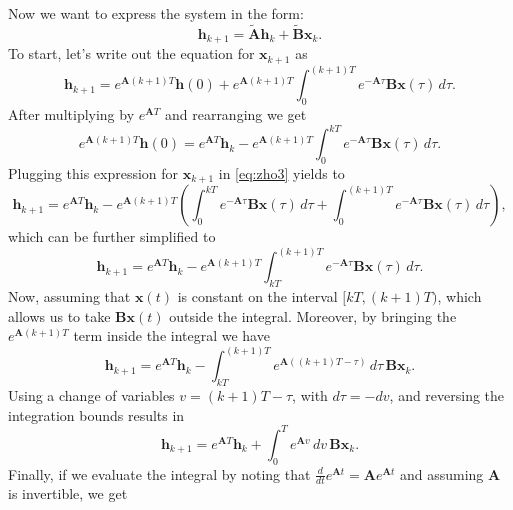 {\begin{equation}
\end{equation}
Now we want to express the system in the form:
\begin{equation}
\mathbf{h}_{k+1} = \mathbf{\tilde{A}} \mathbf{h}_k + \mathbf{\tilde{B}} \mathbf{x}_k.
\end{equation}
To start, let’s write out the equation for \(\mathbf{x}_{k+1}\) as
\begin{equation}
\mathbf{h}_{k+1} = e^{\mathbf{A}(k+1)T} \mathbf{h}(0) + e^{\mathbf{A}(k+1)T} \int_0^{(k+1)T} e^{-\mathbf{A}\tau} \mathbf{B} \mathbf{x}(\tau) \, d\tau.
\label{eq:zho3}
\end{equation}
After multiplying by \(e^{\mathbf{A}T}\) and rearranging we get
\begin{equation}
e^{\mathbf{A}(k+1)T} \mathbf{h}(0) = e^{\mathbf{A}T} \mathbf{h}_k - e^{\mathbf{A}(k+1)T} \int_0^{kT} e^{-\mathbf{A}\tau} \mathbf{B}\mathbf{x}(\tau) \, d\tau.
\end{equation}
Plugging this expression for \(\mathbf{x}_{k+1}\) in \cref{eq:zho3} yields to
\begin{equation}
\mathbf{h}_{k+1} = e^{\mathbf{A}T} \mathbf{h}_k - e^{\mathbf{A}(k+1)T} \left( \int_0^{kT} e^{-\mathbf{A}\tau} \mathbf{B}\mathbf{x}(\tau) \, d\tau + \int_0^{(k+1)T} e^{-\mathbf{A}\tau} \mathbf{B}\mathbf{x}(\tau) \, d\tau \right),
\end{equation}
which can be further simplified to
\begin{equation}
\mathbf{h}_{k+1} = e^{\mathbf{A}T} \mathbf{h}_k - e^{\mathbf{A}(k+1)T} \int_{kT}^{(k+1)T} e^{-\mathbf{A}\tau} \mathbf{B}\mathbf{x}(\tau) \, d\tau.
\end{equation}
Now, assuming that \(\mathbf{x}(t)\) is constant on the interval \([kT, (k+1)T)\), which allows us to take \(\mathbf{B}\mathbf{x}(t)\) outside the integral. Moreover, by bringing the \(e^{\mathbf{A}(k+1)T}\) term inside the integral we have
\begin{equation}
\mathbf{h}_{k+1} = e^{\mathbf{A}T} \mathbf{h}_k - \int_{kT}^{(k+1)T} e^{\mathbf{A}((k+1)T - \tau)} \, d\tau \, \mathbf{B}\mathbf{x}_k.
\end{equation}
Using a change of variables \(v = (k+1)T - \tau\), with \(d\tau = -dv\), and reversing the integration bounds results in
\begin{equation}
\mathbf{h}_{k+1} = e^{\mathbf{A}T} \mathbf{h}_k + \int_0^T e^{\mathbf{A}v} \, dv \, \mathbf{B}\mathbf{x}_k.
\end{equation}
Finally, if we evaluate the integral by noting that \(\frac{d}{dt} e^{\mathbf{A}t} = \mathbf{A} e^{\mathbf{A}t}\) and assuming \(\mathbf{A}\) is invertible, we get
}

